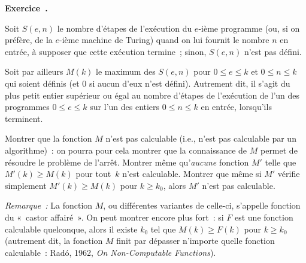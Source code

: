 \documentclass[12pt,a4paper]{article}
\theoremstyle{definition}
\newcommand\exercice{%
\refstepcounter{comcnt}\bigskip\noindent\textbf{Exercice~\thecomcnt.}}
\begin{document}
%

\exercice

Soit $S(e,n)$ le nombre d'étapes de l'exécution du $e$-ième programme
(ou, si on préfère, de la $e$-ième machine de Turing) quand on lui
fournit le nombre $n$ en entrée, à supposer que cette exécution
termine ; sinon, $S(e,n)$ n'est pas défini.

Soit par ailleurs $M(k)$ le maximum des $S(e,n)$ pour $0\leq e\leq k$
et $0\leq n\leq k$ qui soient définis (et $0$ si aucun d'eux n'est
défini).  Autrement dit, il s'agit du plus petit entier supérieur ou
égal au nombre d'étapes de l'exécution de l'un des programmes $0\leq
e\leq k$ sur l'un des entiers $0\leq n\leq k$ en entrée, lorsqu'ils
terminent.

Montrer que la fonction $M$ n'est pas calculable (i.e., n'est pas
calculable par un algorithme) : on pourra pour cela montrer que la
connaissance de $M$ permet de résoudre le problème de l'arrêt.
Montrer même qu'\emph{aucune} fonction $M'$ telle que $M'(k) \geq
M(k)$ pour tout $k$ n'est calculable.  Montrer que même si $M'$
vérifie simplement $M'(k)\geq M(k)$ pour $k\geq k_0$, alors $M'$ n'est
pas calculable.

\emph{Remarque :} La fonction $M$, ou différentes variantes de
celle-ci, s'appelle fonction du « castor affairé ».  On peut montrer
encore plus fort : si $F$ est une fonction calculable quelconque,
alors il existe $k_0$ tel que $M(k) \geq F(k)$ pour $k\geq k_0$
(autrement dit, la fonction $M$ finit par dépasser n'importe quelle
fonction calculable : Radó, 1962, \textit{On Non-Computable
  Functions}).
\end{document}
